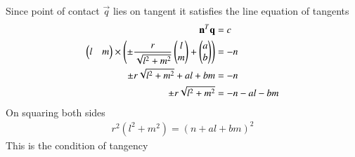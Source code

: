 \documentclass[journal,12pt,twocolumn]{IEEEtran}
\begin{document}
Since point of contact $\vec{q}$ lies on tangent it satisfies the line equation of tangents
\begin{align}
    \mathbf{n}^T\mathbf{q} &= c\\
    \begin{pmatrix}l&m\end{pmatrix}\times \left(
    \pm\frac{r}{\sqrt{l^2+m^2}}\begin{pmatrix}l\\m\end{pmatrix}+\begin{pmatrix}a\\b\end{pmatrix}\right)&=-n\\
    \pm r\sqrt{l^2+m^2}+al+bm&=-n\\
    \pm r\sqrt{l^2+m^2}&=-n-al-bm
\end{align}
On squaring both sides
\begin{align}
    r^2(l^2+m^2)=(n+al+bm)^2
\end{align} 
This is the condition of tangency
\end{document}
